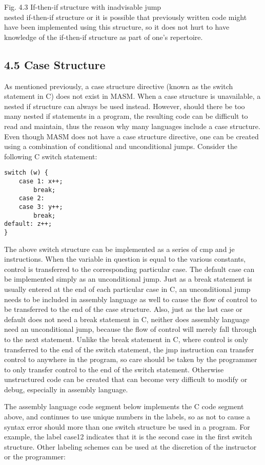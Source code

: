 \documentclass[10pt]{article}
\begin{document}
Fig. 4.3 If-then-if structure with inadvisable jump\\
nested if-then-if structure or it is possible that previously written code might have been implemented using this structure, so it does not hurt to have knowledge of the if-then-if structure as part of one's repertoire.

\subsection*{4.5 Case Structure}
As mentioned previously, a case structure directive (known as the switch statement in C) does not exist in MASM. When a case structure is unavailable, a nested if structure can always be used instead. However, should there be too many nested if statements in a program, the resulting code can be difficult to read and maintain, thus the reason why many languages include a case structure. Even though MASM does not have a case structure directive, one can be created using a combination of conditional and unconditional jumps. Consider the following C switch statement:

\begin{verbatim}
switch (w) {
    case 1: x++;
        break;
    case 2:
    case 3: y++;
        break;
default: z++;
}
\end{verbatim}

The above switch structure can be implemented as a series of cmp and je instructions. When the variable in question is equal to the various constants, control is transferred to the corresponding particular case. The default case can be implemented simply as an unconditional jump. Just as a break statement is usually entered at the end of each particular case in C, an unconditional jump needs to be included in assembly language as well to cause the flow of control to be transferred to the end of the case structure. Also, just as the last case or default does not need a break statement in C, neither does assembly language need an unconditional jump, because the flow of control will merely fall through to the next statement. Unlike the break statement in C, where control is only transferred to the end of the switch statement, the jmp instruction can transfer control to anywhere in the program, so care should be taken by the programmer to only transfer control to the end of the switch statement. Otherwise unstructured code can be created that can become very difficult to modify or debug, especially in assembly language.

The assembly language code segment below implements the C code segment above, and continues to use unique numbers in the labels, so as not to cause a syntax error should more than one switch structure be used in a program. For\\
example, the label case12 indicates that it is the second case in the first switch structure. Other labeling schemes can be used at the discretion of the instructor or the programmer:
\end{document}
